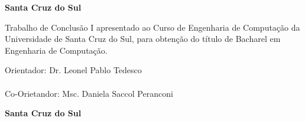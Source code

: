 \begin{titlepage}


\begin{center}
{\LARGE \nomedoaluno}
\par
\vspace{200pt}
{\Huge \titulo}
\par
\vfill
\textbf{{\large Santa Cruz do Sul}\\
{\large \the\year}}
\pagestyle{fancy}
\end{center}
\end{titlepage}


\thispagestyle{empty}

\begin{center}
{\LARGE \nomedoaluno}
\par
\vspace{200pt}
{\Huge \titulo}
\end{center}
\par
\vspace{90pt}
\hspace*{160pt}\parbox{8.5cm}{{\large Trabalho de Conclusão I apresentado ao Curso de Engenharia de Computação da Universidade de Santa Cruz do Sul, para obtenção do título de Bacharel em Engenharia de Computação.}}

\par
\vspace{1cm}
\hspace*{160pt}\parbox{8.5cm}{{
	\large Orientador: Dr. Leonel Pablo Tedesco
	\\
	\\
	\large Co-Orietandor: Msc. Daniela Saccol Peranconi
	}}
\vspace{4cm}
\par
\vfill
\begin{center}
\textbf{{\large Santa Cruz do Sul}\\
{\large \the\year}}
\end{center}

\newpage

